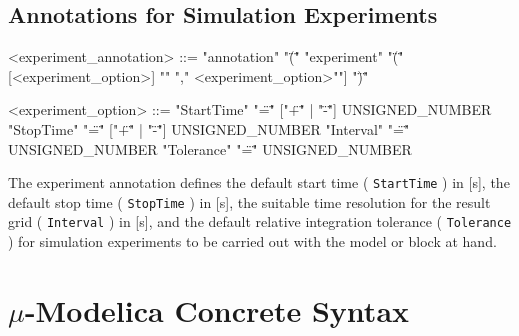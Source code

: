 \documentclass[11pt,a4paper,notitlepage]{report}
\begin{document}
\section{Annotations for Simulation Experiments}
\begin{grammar}
<experiment_annotation> ::=
"annotation" "\"(\"" "experiment" "\"(\"" [<experiment_option>] "{" "," <experiment_option>"}"] "\")\""

<experiment_option> ::=
"StartTime" "\"=\"" ["\"+\"" | "\"-\""] UNSIGNED_NUMBER 
\alt "StopTime" "\"=\"" ["\"+\"" | "\"-\""] UNSIGNED_NUMBER 
\alt "Interval" "\"=\""  UNSIGNED_NUMBER
\alt "Tolerance" "\"=\"" UNSIGNED_NUMBER
\end{grammar}

The experiment annotation defines the default start time ( \verb"StartTime" ) in [s], the default stop time ( \verb"StopTime" ) in [s], the suitable time resolution for the result grid ( \verb"Interval" ) in [s], and the default relative integration tolerance ( \verb"Tolerance" ) for simulation experiments to be carried out with the model or block at hand.

%

\chapter{$\mu$-Modelica Concrete Syntax}\label{ch:grammar}
\end{document}

